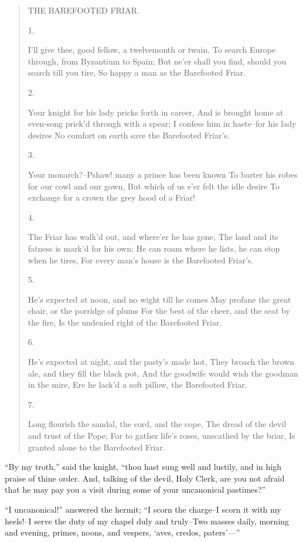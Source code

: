 \begin{quote}
THE BAREFOOTED FRIAR.

1.

I'll give thee, good fellow, a twelvemonth or twain,
To search Europe through, from Byzantium to Spain;
But ne'er shall you find, should you search till you tire,
So happy a man as the Barefooted Friar.

2.

Your knight for his lady pricks forth in career,
And is brought home at even-song prick'd through with a spear;
I confess him in haste--for his lady desires
No comfort on earth save the Barefooted Friar's.

3.

Your monarch?--Pshaw! many a prince has been known
To barter his robes for our cowl and our gown,
But which of us e'er felt the idle desire
To exchange for a crown the grey hood of a Friar!

4.

The Friar has walk'd out, and where'er he has gone,
The land and its fatness is mark'd for his own;
He can roam where he lists, he can stop when he tires,
For every man's house is the Barefooted Friar's.

5.

He's expected at noon, and no wight till he comes
May profane the great chair, or the porridge of plums
For the best of the cheer, and the seat by the fire,
Is the undenied right of the Barefooted Friar.

6.

He's expected at night, and the pasty's made hot,
They broach the brown ale, and they fill the black pot,
And the goodwife would wish the goodman in the mire,
Ere he lack'd a soft pillow, the Barefooted Friar.

7.

Long flourish the sandal, the cord, and the cope,
The dread of the devil and trust of the Pope;
For to gather life's roses, unscathed by the briar,
Is granted alone to the Barefooted Friar.
\end{quote}

``By my troth,'' said the knight, ``thou hast sung well and lustily, and
in high praise of thine order. And, talking of the devil, Holy Clerk,
are you not afraid that he may pay you a visit during some of your
uncanonical pastimes?''

``I uncanonical!'' answered the hermit; ``I scorn the charge--I scorn it
with my heels!--I serve the duty of my chapel duly and truly--Two masses
daily, morning and evening, primes, noons, and vespers, `aves, credos,
paters'---''

